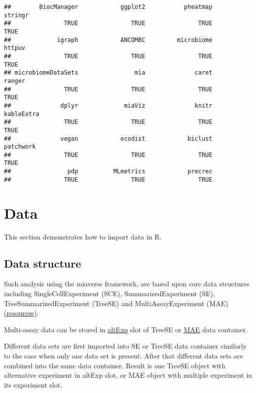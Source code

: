\documentclass[
  oneside]{book}
\begin{document}
\begin{verbatim}
##        BiocManager            ggplot2           pheatmap            stringr 
##               TRUE               TRUE               TRUE               TRUE 
##             igraph            ANCOMBC         microbiome             httpuv 
##               TRUE               TRUE               TRUE               TRUE 
## microbiomeDataSets                mia              caret             ranger 
##               TRUE               TRUE               TRUE               TRUE 
##              dplyr             miaViz              knitr         kableExtra 
##               TRUE               TRUE               TRUE               TRUE 
##              vegan            ecodist            biclust          patchwork 
##               TRUE               TRUE               TRUE               TRUE 
##                pdp          MLmetrics            precrec 
##               TRUE               TRUE               TRUE
\end{verbatim}

\hypertarget{data}{%
\chapter{Data}\label{data}}

This section demonstrates how to import data in R.

\hypertarget{data-structure}{%
\section{Data structure}\label{data-structure}}

Such analysis using the miaverse framework, are based upon core data structures
including SingleCellExperiment (SCE), SummarizedExperiment (SE), TreeSummarizedExperiment (TreeSE) and MultiAssayExperiment (MAE) \href{https://microbiome.github.io/course_2022_miaverse/study-material.html\#resources-for-treesummarizedexperiment}{(resources)}.

Multi-assay data can be stored in \href{https://microbiome.github.io/OMA/containers.html\#alternative-experiments}{altExp}
slot of TreeSE or \href{https://microbiome.github.io/OMA/containers.html\#multiassayexperiments}{MAE} data container.

Different data sets are first imported into SE or TreeSE data container similarly to the case when only one data set is present. After that different data sets are combined into the same data container. Result is one TreeSE object with alternative experiment in altExp slot, or MAE object with multiple experiment in its experiment slot.
\end{document}
